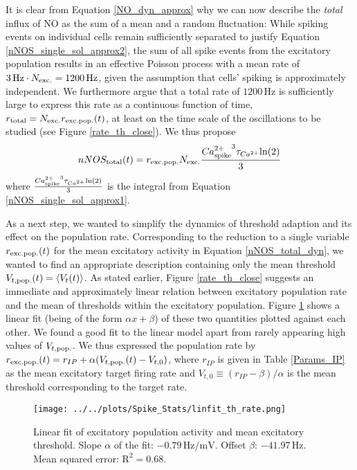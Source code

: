 \documentclass[10pt,a4paper]{article}
\begin{document}
It is clear from Equation \eqref{NO_dyn_approx} why we can now describe the \emph{total} influx of NO as the sum of a mean and a random fluctuation: While spiking events on individual cells remain sufficiently separated to justify Equation \eqref{nNOS_single_sol_approx2}, the sum of all spike events from the excitatory population results in an effective Poisson process with a mean rate of $\mathrm{3\, Hz} \cdot N_{\rm exc.} = \mathrm{1200\,Hz}$, given the assumption that cells' spiking is approximately independent. We furthermore argue that a total rate of $\mathrm{1200\,Hz}$ is sufficiently large to express this rate as a continuous function of time, $r_{\rm total} = N_{\rm exc.} r_{\rm exc.pop.}(t)$, at least on the time scale of the oscillations to be studied (see  Figure \ref{rate_th_close}). We thus propose
\begin{equation}
nNOS_{\rm total}(t) = r_{\rm exc.pop.} N_{\rm exc.}\frac{{Ca^{2+}_{\rm spike}}^3 \tau_{Ca^{2+}} \mathrm{ln} (2)}{3}
\label{nNOS_total_dyn}
\end{equation} 
where $\frac{{Ca^{2+}_{\rm spike}}^3 \tau_{Ca^{2+}} \mathrm{ln} (2)}{3}$ is the integral from Equation \eqref{nNOS_single_sol_approx1}.

As a next step, we wanted to simplify the dynamics of threshold adaption and its effect on the population rate. Corresponding to the reduction to a single variable $r_{\rm exc.pop.}(t)$ for the mean excitatory activity in Equation \eqref{nNOS_total_dyn}, we wanted to find an appropriate description containing only the mean threshold $V_{t,\rm pop.}(t) = \langle V_t(t) \rangle$. As stated earlier, Figure \ref{rate_th_close} suggests an immediate and approximately linear relation between excitatory population rate and the mean of thresholds within the excitatory population. Figure \ref{thresh_r_linfit} shows a linear fit (being of the form $\alpha x + \beta$) of these two quantities plotted against each other. We found a good fit to the linear model apart from rarely appearing high values of $V_{t,\rm pop.}$. We thus expressed the population rate by $r_{\rm exc.pop.}(t) = r_{IP} + \alpha(V_{t,\rm pop.}(t)-V_{t,0})$, where $r_{IP}$ is given in Table \ref{Params_IP} as the mean excitatory target firing rate and $V_{t,0} \equiv (r_{IP}-\beta)/\alpha$ is the mean threshold corresponding to the target rate.
\begin{figure}
\texttt{[image: ../../plots/Spike\_Stats/linfit\_th\_rate.png]}
\caption[Linear fit of excitatory population activity and mean excitatory threshold]{Linear fit of excitatory population activity and mean excitatory threshold. Slope $\alpha$ of the fit: $\mathrm{-0.79\, Hz/mV}$. Offset $\beta$: $\mathrm{-41.97\, Hz}$. Mean squared error: $\mathrm{R^2 = 0.68}$.}
\label{thresh_r_linfit}
\end{figure}
\end{document}
